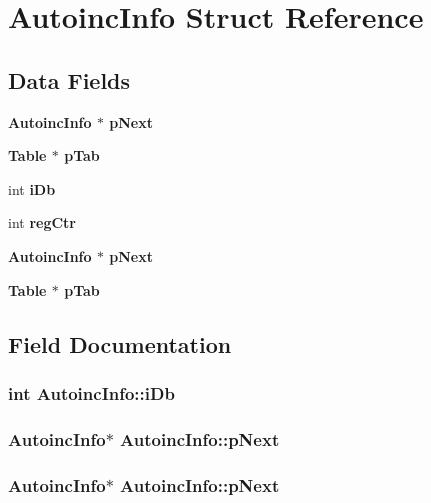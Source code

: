 \section{Autoinc\-Info Struct Reference}
\label{structAutoincInfo}
\subsection*{Data Fields}
\begin{CompactItemize}
\item 
\bf{Autoinc\-Info} $\ast$ \bf{p\-Next}
\item 
\bf{Table} $\ast$ \bf{p\-Tab}
\item 
int \bf{i\-Db}
\item 
int \bf{reg\-Ctr}
\item 
\bf{Autoinc\-Info} $\ast$ \bf{p\-Next}
\item 
\bf{Table} $\ast$ \bf{p\-Tab}
\end{CompactItemize}


\subsection{Field Documentation}
\subsubsection{\setlength{\rightskip}{0pt plus 5cm}int \bf{Autoinc\-Info::i\-Db}}\label{structAutoincInfo_4a6e76ba4489530062df81a9ab933959}


\subsubsection{\setlength{\rightskip}{0pt plus 5cm}\bf{Autoinc\-Info}$\ast$ \bf{Autoinc\-Info::p\-Next}}\label{structAutoincInfo_2d7c98b94cf03491c3c1557a25778128}


\subsubsection{\setlength{\rightskip}{0pt plus 5cm}\bf{Autoinc\-Info}$\ast$ \bf{Autoinc\-Info::p\-Next}}\label{structAutoincInfo_2d7c98b94cf03491c3c1557a25778128}


